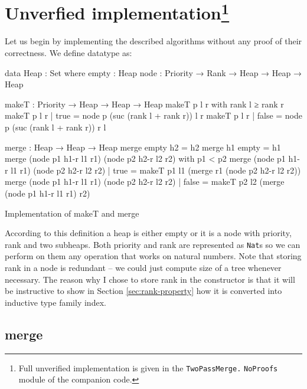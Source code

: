\section[Unverfied implementation]{Unverfied implementation\footnote{Full unverified implementation is given in the \texttt{TwoPassMerge.} \texttt{NoProofs} module of the companion code.}}


Let us begin by implementing the described algorithms without any proof of their correctness. We define \Heap datatype as:

\begin{code}
data Heap : Set where
  empty : Heap
  node  : Priority → Rank → Heap → Heap → Heap
\end{code}

\begin{listing}[b!]
\begin{code}
makeT : Priority → Heap → Heap → Heap
makeT p l r with rank l ≥ rank r
makeT p l r | true  = node p (suc (rank l + rank r)) l r
makeT p l r | false = node p (suc (rank l + rank r)) r l

merge : Heap → Heap → Heap
merge empty h2 = h2
merge h1 empty = h1
merge (node p1 h1-r l1 r1) (node p2 h2-r l2 r2)
  with p1 < p2
merge (node p1 h1-r l1 r1) (node p2 h2-r l2 r2)
  | true  = makeT p1 l1 (merge r1 (node p2 h2-r l2 r2))
merge (node p1 h1-r l1 r1) (node p2 h2-r l2 r2)
  | false = makeT p2 l2 (merge (node p1 h1-r l1 r1) r2)
\end{code}
\caption{Implementation of makeT and merge}\label{lst:makeT-merge}
\end{listing}

According to this definition a heap is either empty or it is a node with priority, rank and two subheaps. Both priority and rank are represented as \texttt{Nat}s so we can perform on them any operation that works on natural numbers. Note that storing rank in a node is redundant -- we could just compute size of a tree whenever necessary. The reason why I chose to store rank in the constructor is that it will be instructive to show in Section \ref{sec:rank-property} how it is converted into inductive type family index.

\subsection{merge}

